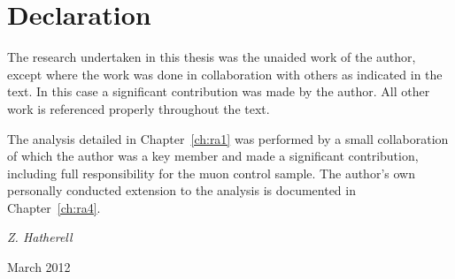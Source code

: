 \chapter*{Declaration}

\normalsize

The research undertaken in this thesis was the unaided work of the author, except where the work was done in collaboration
with others as indicated in the text. In this case a significant contribution was made by the author. All other work is referenced properly throughout the text. 

The analysis detailed in Chapter~\ref{ch:ra1} was performed by a small collaboration of which the author was a key member and made a significant contribution, including full responsibility for the muon control sample. The author's own personally conducted extension to the analysis is documented in Chapter~\ref{ch:ra4}. 





\vspace{20mm}
\hfill {\it Z. Hatherell}

\hfill March 2012





